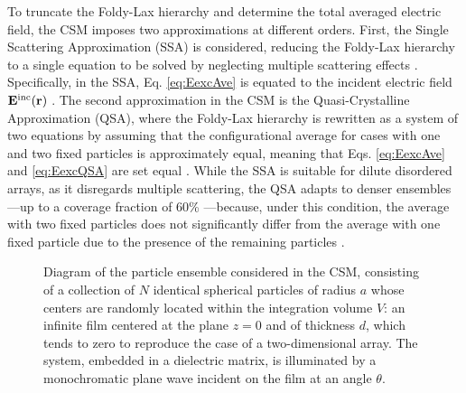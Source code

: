 To truncate the Foldy-Lax hierarchy and determine the total averaged electric field, the CSM imposes two approximations at different orders. First, the Single Scattering Approximation (SSA) is considered, reducing the Foldy-Lax hierarchy to a single equation to be solved by neglecting multiple scattering effects \cite{barrera_coherent_2003}. Specifically, in the SSA, Eq. \eqref{eq:EexcAve} is equated to the incident electric field $\vb{E}^\text{inc}(\vb{r})$ \cite{loiko_monolayers_1998,garcia2012multiple}. The second approximation in the CSM is the Quasi-Crystalline Approximation (QSA), where the Foldy-Lax hierarchy is rewritten as a system of two equations by assuming that the configurational average for cases with one and two fixed particles is approximately equal, meaning that Eqs. \eqref{eq:EexcAve} and \eqref{eq:EexcQSA} are set equal \cite{loiko_monolayers_1998,barrera_coherent_2003}. While the SSA is suitable for dilute disordered arrays, as it disregards multiple scattering, the QSA adapts to denser ensembles—up to a coverage fraction of 60\% \cite{loiko_monolayers_1998}—because, under this condition, the average with two fixed particles does not significantly differ from the average with one fixed particle due to the presence of the remaining particles \cite{barrera_coherent_2003}.

\begin{figure}[t!]\centering
	\caption{Diagram of the particle ensemble considered in the CSM, consisting of a collection of $N$ identical spherical particles of radius $a$ whose centers are randomly located within the integration volume $V$: an infinite film centered at the plane $z=0$ and of thickness $d$, which tends to zero to reproduce the case of a two-dimensional array. The system, embedded in a dielectric matrix, is illuminated by a monochromatic plane wave incident on the film at an angle $\theta$.}
	\label{fig:esquema}
\end{figure}

